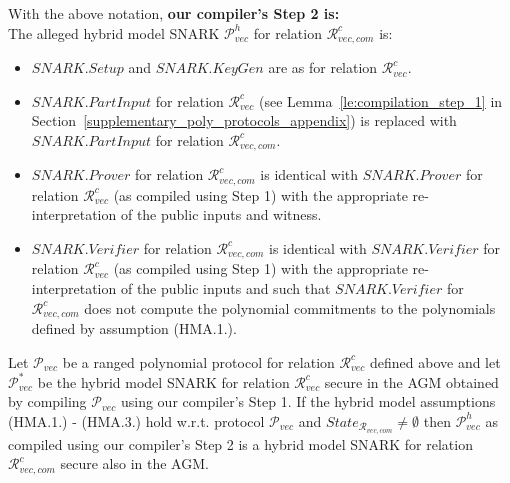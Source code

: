 \noindent With the above notation, \textbf{our compiler's Step 2 is:} \\
\noindent The alleged hybrid model SNARK $\mathscr{P}_{\mathit{vec}}^{h}$ for relation $\mathcal{R}_{\mathit{vec}, \mathit{com}}^c$ is:
\begin{itemize}
\item $\mathit{SNARK.Setup}$ and $\mathit{SNARK.KeyGen}$ are as for relation $\mathcal{R}^{c}_{\mathit{vec}}$.
\item $\mathit{SNARK.PartInput}$ for relation $\mathcal{R}^{c}_{\mathit{vec}}$ 
(see Lemma~\ref{le:compilation_step_1} in Section~\ref{supplementary_poly_protocols_appendix}) 
is replaced with $\mathit{SNARK.PartInput}$ for relation $\mathcal{R}_{\mathit{vec}, \mathit{com}}^c$.
\item $\mathit{SNARK.Prover}$ for relation $\mathcal{R}_{\mathit{vec}, \mathit{com}}^c$ is identical with 
$\mathit{SNARK.Prover}$ for relation $\mathcal{R}^{c}_{\mathit{vec}}$ (as compiled using Step 1) with the appropriate 
re-interpretation of the public inputs and witness.
\item $\mathit{SNARK.Verifier}$ for relation $\mathcal{R}_{\mathit{vec}, \mathit{com}}^c$ is identical with 
$\mathit{SNARK.Verifier}$ for relation $\mathcal{R}^{c}_{\mathit{vec}}$ (as compiled using Step 1) with the appropriate 
re-interpretation of the public inputs and such that $\mathit{SNARK.Verifier}$ for $\mathcal{R}_{\mathit{vec}, \mathit{com}}^c$ does
not compute the polynomial commitments to the polynomials defined by assumption (HMA.1.).
\end{itemize}
\noindent \begin{lemma} 
\label{sergey_type_relations} 
Let $\mathscr{P}_{\mathit{vec}}$ be a ranged polynomial protocol for relation $\mathcal{R}^c_{\mathit{vec}}$ defined above and let 
$\mathscr{P}_{\mathit{vec}}^{*}$ be the hybrid model SNARK for relation $\mathcal{R}^c_{\mathit{vec}}$ secure in the AGM obtained 
by compiling $\mathscr{P}_{\mathit{vec}}$ using our compiler's Step 1. If the hybrid model assumptions (HMA.1.) - (HMA.3.) hold w.r.t. 
protocol $\mathscr{P}_{\mathit{vec}}$ and $\mathit{State}_{\mathcal{R}_{\mathit{vec}, \mathit{com}}} \neq \emptyset $ then 
$\mathscr{P}_{\mathit{vec}}^{h}$ as compiled using our compiler's Step 2 is a hybrid model SNARK for relation 
$\mathcal{R}_{\mathit{vec}, \mathit{com}}^c$ secure also in the AGM.
\end{lemma}


